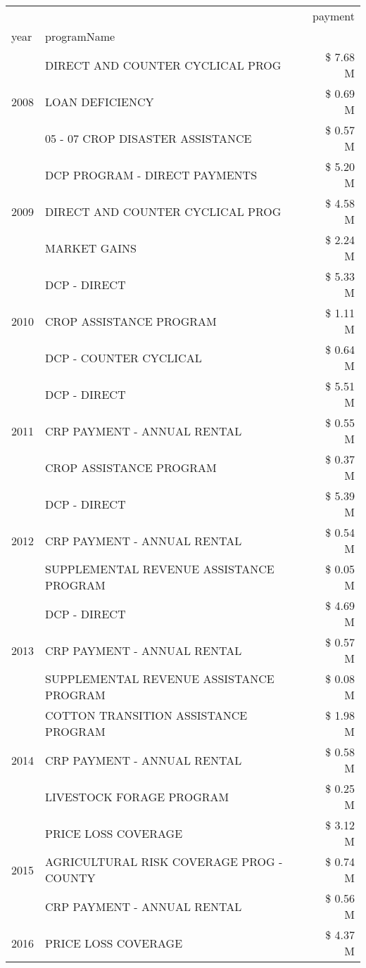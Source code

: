 \begin{tabular}{llr}
\toprule
 &  & payment \\
year & programName &  \\
\midrule
\multirow[t]{3}{*}{2008} & DIRECT AND COUNTER CYCLICAL PROG & \$ 7.68 M \\
 & LOAN DEFICIENCY & \$ 0.69 M \\
 & 05 - 07 CROP DISASTER ASSISTANCE & \$ 0.57 M \\
\cline{1-3}
\multirow[t]{3}{*}{2009} & DCP PROGRAM - DIRECT PAYMENTS & \$ 5.20 M \\
 & DIRECT AND COUNTER CYCLICAL PROG & \$ 4.58 M \\
 & MARKET GAINS & \$ 2.24 M \\
\cline{1-3}
\multirow[t]{3}{*}{2010} & DCP - DIRECT & \$ 5.33 M \\
 & CROP ASSISTANCE PROGRAM & \$ 1.11 M \\
 & DCP - COUNTER CYCLICAL & \$ 0.64 M \\
\cline{1-3}
\multirow[t]{3}{*}{2011} & DCP - DIRECT & \$ 5.51 M \\
 & CRP PAYMENT - ANNUAL RENTAL & \$ 0.55 M \\
 & CROP ASSISTANCE PROGRAM & \$ 0.37 M \\
\cline{1-3}
\multirow[t]{3}{*}{2012} & DCP - DIRECT & \$ 5.39 M \\
 & CRP PAYMENT - ANNUAL RENTAL & \$ 0.54 M \\
 & SUPPLEMENTAL REVENUE ASSISTANCE PROGRAM & \$ 0.05 M \\
\cline{1-3}
\multirow[t]{3}{*}{2013} & DCP - DIRECT & \$ 4.69 M \\
 & CRP PAYMENT - ANNUAL RENTAL & \$ 0.57 M \\
 & SUPPLEMENTAL REVENUE ASSISTANCE PROGRAM & \$ 0.08 M \\
\cline{1-3}
\multirow[t]{3}{*}{2014} & COTTON TRANSITION ASSISTANCE PROGRAM & \$ 1.98 M \\
 & CRP PAYMENT - ANNUAL RENTAL & \$ 0.58 M \\
 & LIVESTOCK FORAGE PROGRAM & \$ 0.25 M \\
\cline{1-3}
\multirow[t]{3}{*}{2015} & PRICE LOSS COVERAGE & \$ 3.12 M \\
 & AGRICULTURAL RISK COVERAGE PROG - COUNTY & \$ 0.74 M \\
 & CRP PAYMENT - ANNUAL RENTAL & \$ 0.56 M \\
\cline{1-3}
\multirow[t]{3}{*}{2016} & PRICE LOSS COVERAGE & \$ 4.37 M \\

\end{tabular}
